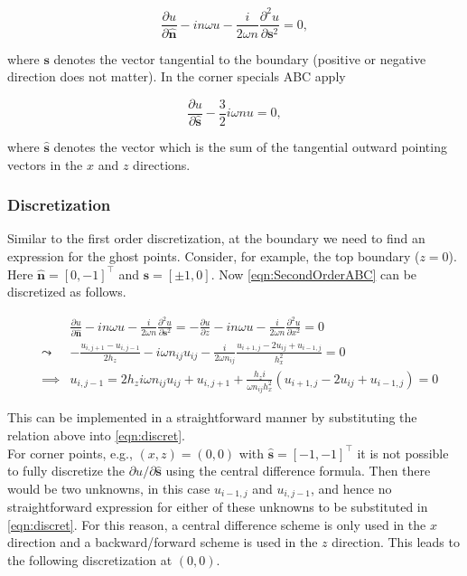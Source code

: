 \documentclass[10pt,a4paper]{article}
\newcommand{\n}{\mathbf{n}}
\newcommand{\s}{\mathbf{s}}
\begin{document}
{\begin{equation} \label{eqn:SecondOrderABC}
\frac{\partial u}{\partial \hat{\n}} - in\omega u - \frac{i}{2\omega n}\frac{\partial^2 u}{\partial \s^2}=0,
\end{equation}

where $\s$ denotes the vector tangential to the boundary (positive or negative direction does not matter). In the corner specials ABC apply \cite{SecondOrderCorner}

\begin{equation}
\frac{\partial u}{\partial \hat{\s}}-\frac{3}{2}i\omega nu=0,
\end{equation}

where $\hat{\s}$ denotes the vector which is the sum of the tangential outward pointing vectors in the $x$ and $z$ directions.

\subsubsection{Discretization}
Similar to the first order discretization, at the boundary we need to find an expression for the ghost points. Consider, for example, the top boundary ($z=0$). Here $\hat{\n}=[0,-1]^\top$ and $\s=[\pm 1,0]$. Now \cref{eqn:SecondOrderABC} can be discretized as follows.

\begin{eqnarray}
&&\frac{\partial u}{\partial \hat{\n}} - in\omega u - \frac{i}{2\omega n}\frac{\partial^2 u}{\partial \s^2}= -\frac{\partial u}{\partial z} - in\omega u - \frac{i}{2\omega n}\frac{\partial^2 u}{\partial x^2}=0\\
&\leadsto& -\frac{u_{i,j+1}-u_{i,j-1}}{2h_z} - i\omega n_{ij}u_{ij}-\frac{i}{2\omega n_{ij}}\frac{u_{i+1,j}-2u_{ij}+u_{i-1,j}}{h_x^2}=0\\
&\implies& u_{i,j-1} = 2h_z i\omega n_{ij}u_{ij}+u_{i,j+1}+\frac{h_z i}{\omega n_{ij}h_x^2}(u_{i+1,j}-2u_{ij}+u_{i-1,j})=0
\end{eqnarray}

This can be implemented in a straightforward manner by substituting the relation above into \cref{eqn:discret}.\\

For corner points, e.g., $(x,z)=(0,0)$ with $\hat{\s}=[-1,-1]^\top$ it is not possible to fully discretize the $\partial u/\partial\hat{\s}$ using the central difference formula. Then there would be two unknowns, in this case $u_{i-1,j}$ and $u_{i,j-1}$, and hence no straightforward expression for either of these unknowns to be substituted in \cref{eqn:discret}. For this reason, a central difference scheme is only used in the $x$ direction and a backward/forward scheme is used in the $z$ direction. This leads to the following discretization at $(0,0)$.

}
\end{document}
